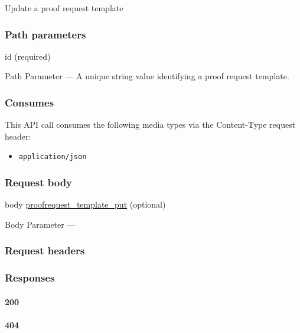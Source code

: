 Update a proof request template

\hypertarget{path-parameters-55}{%
\subsubsection{Path parameters}\label{path-parameters-55}}

id (required)

{Path Parameter} --- A unique string value identifying a proof request
template.

\hypertarget{consumes-34}{%
\subsubsection{Consumes}\label{consumes-34}}

This API call consumes the following media types via the {Content-Type}
request header:

\begin{itemize}
\tightlist
\item
  \texttt{application/json}
\end{itemize}

\hypertarget{request-body-34}{%
\subsubsection{Request body}\label{request-body-34}}

body
\protect\hyperlink{proofrequest_template_put}{proofrequest\_template\_put}
(optional)

{Body Parameter} ---

\hypertarget{request-headers-59}{%
\subsubsection{Request headers}\label{request-headers-59}}

\hypertarget{responses-107}{%
\subsubsection{Responses}\label{responses-107}}

\hypertarget{section-351}{%
\paragraph{200}\label{section-351}}

\protect\hyperlink{}{}

\hypertarget{section-352}{%
\paragraph{404}\label{section-352}}

